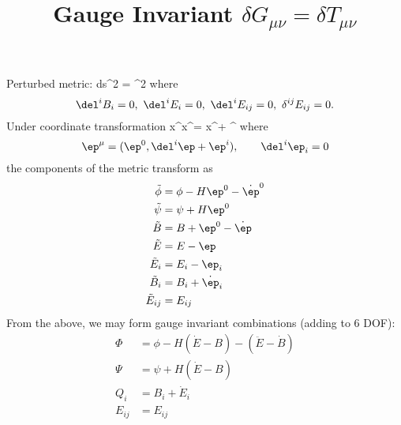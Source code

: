 \documentclass[10pt,letterpaper]{article}
\title{Gauge Invariant $\delta G_{\mu\nu} = \delta T_{\mu\nu}$}
\author{}
\date{}
\begin{document}
\maketitle 
\noindent Perturbed metric:
\be
	ds^2 = \Omega^2 
\ee
where
\[
	\del^i B_i = 0,\ \del^i E_i = 0,\ \del^i E_{ij} = 0,\ \delta^{ij}E_{ij} = 0.
\]
Under coordinate transformation
\be
	x^\mu \to \tilde x^\mu = x^\mu + \ep^\mu
\ee
where 
\[
	\ep^\mu = (\ep^0, \del^i \ep + \ep^i),\qquad \del^i \ep_i = 0
\]
the components of the metric transform as
\begin{align}
	\tilde \phi &= \phi - H \ep^0 - \dot \ep^0\\
	\tilde \psi &= \psi + H \ep^0\\
	\tilde B &=B + \ep^0 - \dot \ep\\
	\tilde E &= E-\ep \\
	\tilde E_{i}&= E_i - \ep_i\\
	\tilde B_i &= B_i + \dot \ep_i\\
	\tilde E_{ij} &= E_{ij}
\end{align}
From the above, we may form gauge invariant combinations (adding to 6 DOF):
\begin{align}
	\Phi &= \phi - H(\dot E - B) - (\ddot E - \dot B)\\
	\Psi &= \psi + H(\dot E-B)\\
	Q_i &= B_i + \dot E_i\\
	E_{ij} &= E_{ij}
\end{align}
\end{document}
